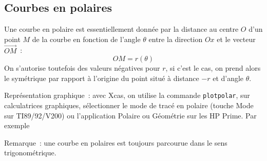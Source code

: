 \documentclass[a4paper,11pt]{article}
\begin{document}
\begin{giacjshere}
\subsection{Courbes en polaires}
Une courbe en polaire est essentiellement
donn\'ee par la distance au centre $O$ d'un
point $M$ de la courbe en fonction de l'angle $\theta$ 
entre la direction $Ox$ et le vecteur $\overrightarrow{OM}$~:
$$ OM = r(\theta)$$ 
On s'autorise toutefois des valeurs n\'egatives pour $r$,
si c'est le cas, on prend alors le sym\'etrique par rapport
\`a l'origine du point situ\'e \`a distance $-r$ et d'angle $\theta$.

Repr\'esentation graphique~: avec Xcas, on utilise
la commande \verb|plotpolar|, sur calculatrices
graphiques, s\'electionner le mode de trac\'e en polaire (touche Mode
sur TI89/92/V200) ou
l'application Polaire ou G\'eom\'etrie sur les HP Prime.
Par exemple 





Remarque~: une courbe en polaires est toujours parcourue dans le sens
trigonom\'etrique.


\end{giacjshere}
\end{document}
